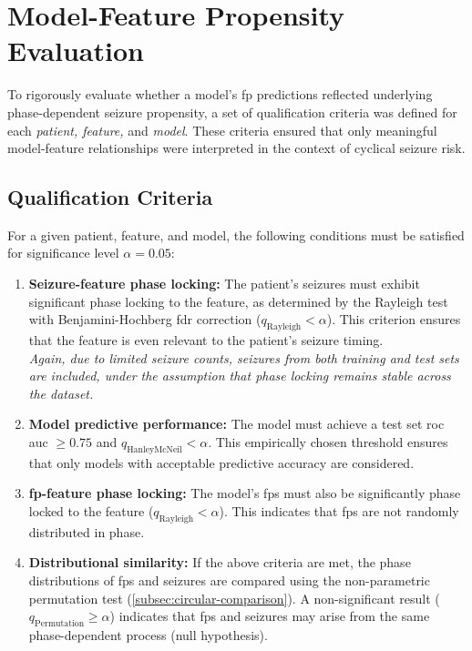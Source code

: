 \section{Model-Feature Propensity Evaluation} \label{sec:propensity-eval}

To rigorously evaluate whether a model's \gls{fp} predictions reflected underlying phase-dependent seizure propensity, a set of qualification criteria was defined for each \textit{patient, feature,} and \textit{model}.
These criteria ensured that only meaningful model-feature relationships were interpreted in the context of cyclical seizure risk.

\subsection{Qualification Criteria} \label{subsec:qualification-criteria}
For a given patient, feature, and model, the following conditions must be satisfied for significance level $\alpha = 0.05$:

\begin{enumerate}
    \item \textbf{Seizure-feature phase locking:} The patient's seizures must exhibit significant phase locking to the feature, as determined by the Rayleigh test with Benjamini-Hochberg \gls{fdr} correction ($q_{\mathrm{Rayleigh}} < \alpha$). This criterion ensures that the feature is even relevant to the patient's seizure timing.\\
    \textit{Again, due to limited seizure counts, seizures from both training and test sets are included, under the assumption that phase locking remains stable across the dataset.}
    \item \textbf{Model predictive performance:} The model must achieve a test set \gls{roc auc} $\geq 0.75$ and $q_{\mathrm{HanleyMcNeil}}<\alpha$.
    This empirically chosen threshold ensures that only models with acceptable predictive accuracy are considered.
    \item \textbf{\gls{fp}-feature phase locking:} The model's \glspl{fp} must also be significantly phase locked to the feature ($q_{\mathrm{Rayleigh}} < \alpha$). This indicates that \glspl{fp} are not randomly distributed in phase.
    \item \textbf{Distributional similarity:} If the above criteria are met, the phase distributions of \glspl{fp} and seizures are compared using the non-parametric permutation test (\cref{subsec:circular-comparison}). A non-significant result ($q_{\mathrm{Permutation}} \geq \alpha$) indicates that \glspl{fp} and seizures may arise from the same phase-dependent process (null hypothesis).
\end{enumerate}

